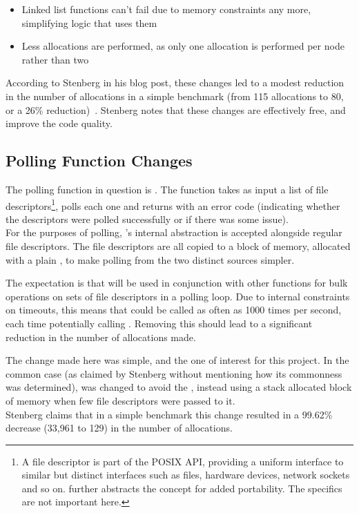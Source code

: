 \begin{itemize}
	\item Linked list functions can't fail due to memory constraints any more, simplifying logic that uses them
	\item Less allocations are performed, as only one allocation is performed per node rather than two
\end{itemize}

According to Stenberg in his blog post, these changes led to a modest reduction in the number of allocations in a simple benchmark (from 115 allocations to 80, or a 26\% reduction)~\cite{curlmalloc}. Stenberg notes that these changes are effectively free, and improve the code quality.

\subsection{Polling Function Changes}

The polling function in question is . The function takes as input a list of file descriptors\footnote{A file descriptor is part of the POSIX API, providing a uniform interface to similar but distinct interfaces such as files, hardware devices, network sockets and so on.  further abstracts the concept for added portability. The specifics are not important here.}, polls each one and returns with an error code (indicating whether the descriptors were polled successfully or if there was some issue).\\
For the purposes of polling, 's internal abstraction is accepted alongside regular file descriptors. The file descriptors are all copied to a block of memory, allocated with a plain \malloc{}, to make polling from the two distinct sources simpler.

The expectation is that  will be used in conjunction with other functions for bulk operations on sets of file descriptors in a polling loop. Due to internal constraints on timeouts, this means that  could be called as often as 1000 times per second, each time potentially calling \malloc{}. Removing this \malloc{} should lead to a significant reduction in the number of allocations made.

The change made here was simple, and the one of interest for this project. In the common case (as claimed by Stenberg without mentioning how its commonness was determined),  was changed to avoid the \malloc{}, instead using a stack allocated block of memory when few file descriptors were passed to it.\\
Stenberg claims that in a simple benchmark this change resulted in a 99.62\% decrease (33,961 to 129) in the number of \malloc{} allocations.

